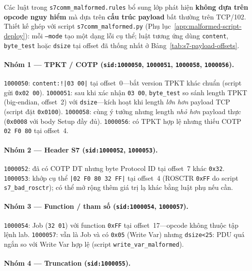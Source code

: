 \documentclass[../main.tex]{subfiles}
\begin{document}
Các luật trong \texttt{s7comm\_malformed.rules} bổ sung lớp phát hiện \textbf{không dựa trên opcode nguy hiểm} mà dựa trên \textbf{cấu trúc payload} bất thường trên TCP/102. Thiết kế ghép với script \texttt{s7comm\_malformed.py} (Phụ lục~\ref{app:malformed-script-deploy}): mỗi \texttt{--mode} tạo một dạng lỗi cụ thể; luật tương ứng dùng \texttt{content}, \texttt{byte\_test} hoặc \texttt{dsize} tại offset đã thống nhất ở Bảng~\ref{tab:s7-payload-offsets}.

\paragraph{Nhóm 1 --- TPKT / COTP (\texttt{sid:1000050}, \texttt{1000051}, \texttt{1000058}, \texttt{1000056}).}

\texttt{1000050}: \texttt{content:!|03 00|} tại offset~0---bắt version TPKT khác chuẩn (script gửi \texttt{0x02 00}). \texttt{1000051}: sau khi xác nhận \texttt{03 00}, \texttt{byte\_test} so sánh length TPKT (big-endian, offset~2) với \texttt{dsize}---kích hoạt khi length \emph{lớn hơn} payload TCP (script đặt \texttt{0x0100}). \texttt{1000058}: cùng ý tưởng nhưng length \emph{nhỏ hơn} payload thực (\texttt{0x0008} với body Setup đầy đủ). \texttt{1000056}: có TPKT hợp lệ nhưng thiếu COTP \texttt{02 F0 80} tại offset~4.

\paragraph{Nhóm 2 --- Header S7 (\texttt{sid:1000052}, \texttt{1000053}).}

\texttt{1000052}: đã có COTP DT nhưng byte Protocol ID tại offset~7 khác \texttt{0x32}. \texttt{1000053}: khớp cụ thể \texttt{|02 F0 80 32 FF|} tại offset~4 (ROSCTR \texttt{0xFF} do script \texttt{s7\_bad\_rosctr}); có thể mở rộng thêm giá trị lạ khác bằng luật phụ nếu cần.

\paragraph{Nhóm 3 --- Function / tham số (\texttt{sid:1000054}, \texttt{1000057}).}

\texttt{1000054}: Job (\texttt{32 01}) với function \texttt{0xFF} tại offset~17---opcode không thuộc tập lệnh lab. \texttt{1000057}: vẫn là Job và có \texttt{0x05} (Write Var) nhưng \texttt{dsize<25}: PDU quá ngắn so với Write Var hợp lệ (script \texttt{write\_var\_malformed}).

\paragraph{Nhóm 4 --- Truncation (\texttt{sid:1000055}).}
\end{document}
